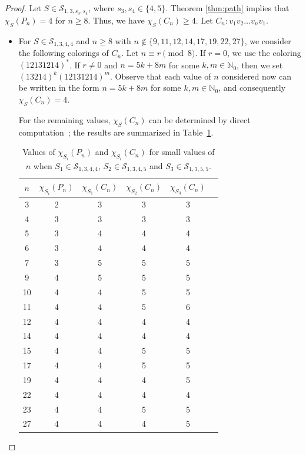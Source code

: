 \documentclass[12pt]{article}
\begin{document}
\begin{proof}
	Let $S \in \mathcal S_{1,3,s_3,s_4}$, where $s_3, s_4 \in \{4, 5\}$. Theorem \ref{thm:path} implies that $\chi_S(P_n)=4$ for $n\geq 8$. Thus, we have $\chi_S(C_n)\ge 4$. Let $C_n \colon v_1v_2 \dots v_nv_1$.
	\begin{itemize} 
		
	\item[$(i)$]  
	For  $S \in \mathcal{S}_{1,3,4,4}$ and $n \ge 8$  with $n \notin \{9,11,12,14,17,19,22,27\}$, we consider the following colorings of $C_n$. 
	Let $n \equiv r \pmod {8}$. 
	If $r=0$, we use the coloring $(12131214)^*$. If $r\neq0$ and $n=5k+8m$ for some $k,m \in \mathbb{N}_{0}$, then we set  $(13214)^k(12131214)^m.$ Observe that each value of $n$ considered now can be written in the form 
$n = 5k + 8m$ for some $k, m \in \mathbb{N}_{0}$, and  consequently $\chi_S(C_n)=4$.
	
    For the remaining values,  
	$\chi_S(C_n)$ can be determined by direct computation~\cite{Spackingtool}; the results are summarized in 
	Table~\ref{tab:smallcases1}.

        
\begin{table}[ht!]

\centering
\begin{tabular}{|c||c||c|c|c|c|}
\hline
$n$ & $\chi_{S_i}(P_n)$ 
& $\chi_{S_1}(C_n)$ 
& $\chi_{S_2}(C_n)$ 
& $\chi_{S_3}(C_n)$  \\
\hline
3  & 2 & 3 & 3 & 3 \\ \hline
4  & 3 & 3 & 3 & 3 \\ \hline
5  & 3 & 4 & 4 & 4 \\ \hline
6  & 3 & 4 & 4 & 4 \\ \hline
7  & 3 & 5 & 5 & 5 \\ \hline
9  & 4 & 5 & 5 & 5\\ \hline
10 & 4 & 4 & 5 & 5 \\ \hline
11 & 4 & 4 & 5 & 6 \\ \hline
12 & 4 & 4 & 4 & 4 \\ \hline
14 & 4 & 4 & 4 & 4 \\ \hline
15 & 4 & 4 & 5 & 5 \\ \hline
17 & 4 & 4 & 5 & 5 \\ \hline
19 & 4 & 4 & 4 & 5 \\ \hline
22 & 4 & 4 & 4 & 4 \\ \hline
23 & 4 & 4 & 5 & 5 \\ \hline
27 & 4 & 4 & 4 & 5 \\ 
\hline
\end{tabular}
\caption{Values of $\chi_{S_i}(P_n)$ and $\chi_{S_i}(C_n)$ for small values of $n$ when $S_1 \in \mathcal{S}_{1,3,4,4}$, $S_2 \in \mathcal{S}_{1,3,4,5}$ and $S_3 \in \mathcal{S}_{1,3,5,5}$.}\label{tab:smallcases1}
\end{table}
 


\end{itemize}
\end{proof}
\end{document}
